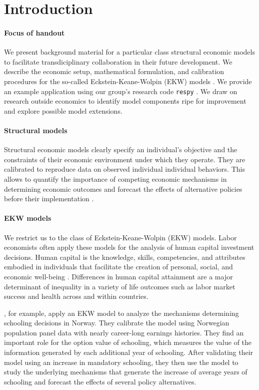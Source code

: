 \section{Introduction}
\paragraph{Focus of handout} We present background material for a particular class structural economic models to facilitate transdiciplinary collaboration in their future development. We describe the economic setup, mathematical formulation, and calibration procedures for the so-called Eckstein-Keane-Wolpin (EKW) models \citep{Aguirregabiria.2010}. We provide an example application using our group's research code \verb+respy+ \citep{respy-1.0}. We draw on research outside economics to identify model components ripe for improvement and explore possible model extensions.

\paragraph{Structural models}  Structural economic models clearly specify an individual's objective and the constraints of their economic environment under which they operate. They are calibrated to reproduce data on observed individual individual behaviors. This allows to quantify the importance of competing economic mechanisms in determining economic outcomes and forecast the effects of alternative policies before their implementation \citep{Wolpin.2013}.

\paragraph{EKW models} We restrict us to the class of Eckstein-Keane-Wolpin (EKW) models. Labor economists often apply these models for the analysis of human capital investment decisions. Human capital is the knowledge, skills, competencies, and attributes embodied in individuals that facilitate the creation of personal, social, and economic well-being \citep{OECD.2001}. Differences in human capital attainment are a major determinant of inequality in a variety of life outcomes such as labor market success and health across and within countries.

\citet{Bhuller.2018}, for example, apply an EKW model to analyze the mechanisms determining schooling decisions in Norway. They calibrate the model using Norwegian population panel data with nearly career-long earnings histories. They find an important role for the option value of schooling, which measures the value of the information generated by each additional year of schooling. After validating their model using an increase in mandatory schooling, they then use the model to study the underlying mechanisms that generate the increase of average years of schooling and forecast the effects of several policy alternatives.

